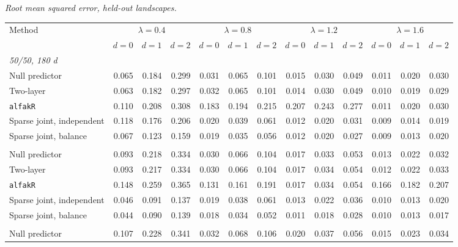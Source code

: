 \noindent\textit{Root mean squared error, held-out landscapes.}
\begin{center}
\scriptsize
\setlength{\tabcolsep}{2.5pt}
\begin{tabular}{l*{12}{r}}
\toprule
Method & \multicolumn{3}{c}{$\lambda=0.4$} & \multicolumn{3}{c}{$\lambda=0.8$} & \multicolumn{3}{c}{$\lambda=1.2$} & \multicolumn{3}{c}{$\lambda=1.6$} \\
\cmidrule(lr){2-4}\cmidrule(lr){5-7}\cmidrule(lr){8-10}\cmidrule(lr){11-13}
 & $d=0$ & $d=1$ & $d=2$ & $d=0$ & $d=1$ & $d=2$ & $d=0$ & $d=1$ & $d=2$ & $d=0$ & $d=1$ & $d=2$ \\
\midrule
\multicolumn{13}{l}{\textit{50/50, 180 d}} \\
\quad Null predictor & 0.065 & 0.184 & 0.299 & 0.031 & 0.065 & 0.101 & 0.015 & 0.030 & 0.049 & 0.011 & 0.020 & 0.030 \\
\quad Two-layer & 0.063 & 0.182 & 0.297 & 0.032 & 0.065 & 0.101 & 0.014 & 0.030 & 0.049 & 0.010 & 0.019 & 0.029 \\
\quad \texttt{alfakR} & 0.110 & 0.208 & 0.308 & 0.183 & 0.194 & 0.215 & 0.207 & 0.243 & 0.277 & 0.011 & 0.020 & 0.030 \\
\quad Sparse joint, independent & 0.118 & 0.176 & 0.206 & 0.020 & 0.039 & 0.061 & 0.012 & 0.020 & 0.031 & 0.009 & 0.014 & 0.019 \\
\quad Sparse joint, balance & 0.067 & 0.123 & 0.159 & 0.019 & 0.035 & 0.056 & 0.012 & 0.020 & 0.027 & 0.009 & 0.013 & 0.020 \\
\addlinespace[2pt]
\multicolumn{13}{l}{\textit{200/200, 180 d}} \\
\quad Null predictor & 0.093 & 0.218 & 0.334 & 0.030 & 0.066 & 0.104 & 0.017 & 0.033 & 0.053 & 0.013 & 0.022 & 0.032 \\
\quad Two-layer & 0.093 & 0.217 & 0.334 & 0.030 & 0.066 & 0.104 & 0.017 & 0.034 & 0.054 & 0.012 & 0.022 & 0.033 \\
\quad \texttt{alfakR} & 0.148 & 0.259 & 0.365 & 0.131 & 0.161 & 0.191 & 0.017 & 0.034 & 0.054 & 0.166 & 0.182 & 0.207 \\
\quad Sparse joint, independent & 0.046 & 0.091 & 0.137 & 0.019 & 0.038 & 0.061 & 0.013 & 0.022 & 0.036 & 0.010 & 0.013 & 0.020 \\
\quad Sparse joint, balance & 0.044 & 0.090 & 0.139 & 0.018 & 0.034 & 0.052 & 0.011 & 0.018 & 0.028 & 0.010 & 0.013 & 0.017 \\
\addlinespace[2pt]
\multicolumn{13}{l}{\textit{200/200, 360 d}} \\
\quad Null predictor & 0.107 & 0.228 & 0.341 & 0.032 & 0.068 & 0.106 & 0.020 & 0.037 & 0.056 & 0.015 & 0.023 & 0.034 \\

\end{tabular}
\end{center}
